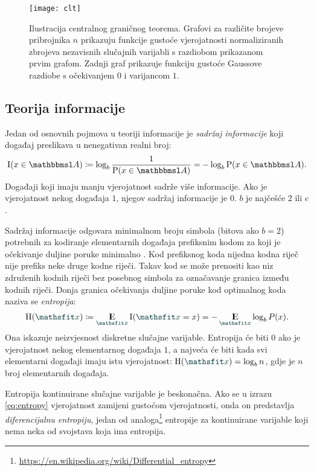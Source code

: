 \documentclass[utf8, diplomski, lmodern]{fer}
\begin{document}
\begin{figure}
	\centering
	\texttt{[image: clt]}
	\caption{Ilustracija centralnog graničnog teorema. Grafovi za različite brojeve pribrojnika $n$ prikazuju funkcije gustoće vjerojatnosti normaliziranih zbrojeva nezavisnih slučajnih varijabli s razdiobom prikazanom prvim grafom. Zadnji graf prikazuje funkciju gustoće Gaussove razdiobe s očekivanjem $0$ i varijancom $1$.}
	\label{fig:clt}
\end{figure}

\subsection{Teorija informacije}

Jedan od osnovnih pojmova u teoriji informacije je \emph{sadržaj informacije} koji događaj preslikava u nenegativan realni broj:
\begin{align}
\I(x\in\set A)\coloneqq\log_b \frac{1}{\P(x\in\set A)} = -\log_b \P(x\in\set A) \text{.}
\end{align}
Događaji koji imaju manju vjerojatnost sadrže više informacije. Ako je vjerojatnost nekog događaja $1$, njegov sadržaj informacije je $0$. $b$ je najčešće $2$ ili $e$.

Sadržaj informacije odgovara minimalnom broju simbola (bitova ako $b=2$) potrebnih za kodiranje elementarnih događaja prefiksnim kodom za koji je očekivanje duljine poruke minimalno \citep{Olah:2015:VIT}. Kod prefiksnog koda nijedna kodna riječ nije prefiks neke druge kodne riječi. Takav kod se može prenositi kao niz združenih kodnih riječi bez posebnog simbola za označavanje granica između kodnih riječi. Donja granica očekivanja duljine poruke kod optimalnog koda naziva se \emph{entropija}:
\begin{align}\label{eq:entropy}
\H(\rvar x) \coloneqq  \E_{\rvar x}\I(\rvar x=x) = -\E_{\rvar x}\log_b P(x) \text{.}
\end{align}
Ona iskazuje neizvjesnost diskretne slučajne varijable. Entropija će biti $0$ ako je vjerojatnost nekog elementarnog događaja $1$, a najveća će biti kada svi elementarni događaji imaju istu vjerojatnost: $\H(\rvar x)=\log_b n$, gdje je $n$ broj elementarnih događaja. 

Entropija kontinuirane slučajne varijable je beskonačna. Ako se u izrazu \eqref{eq:entropy} vjerojatnost zamijeni gustoćom vjerojatnosti, onda on predstavlja \emph{diferencijalnu entropiju}, jedan od analoga\footnote{\url{https://en.wikipedia.org/wiki/Differential_entropy}} entropije za kontinuirane varijable koji nema neka od svojstava koja ima entropija.
\end{document}
